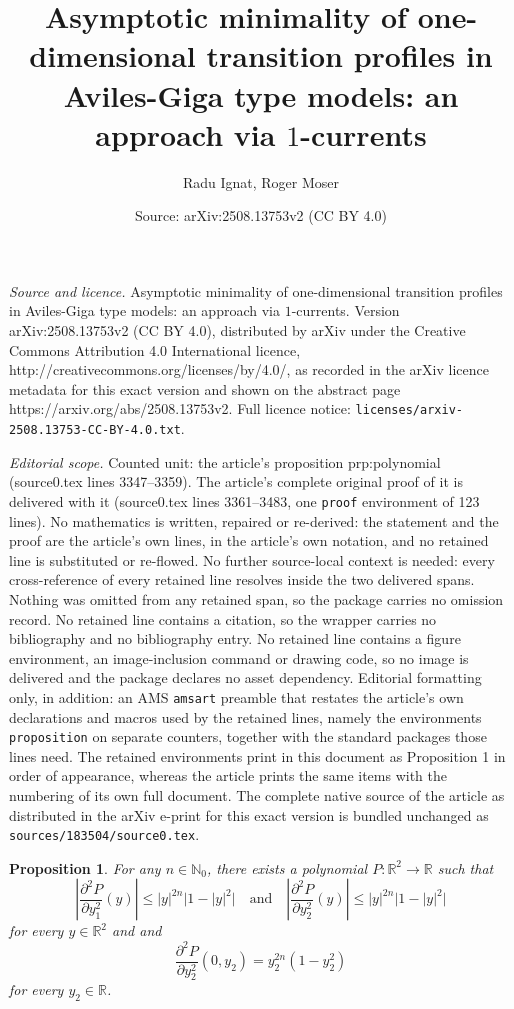 \documentclass[10pt,a4paper]{amsart}
\title{Asymptotic minimality of one-dimensional transition profiles in Aviles-Giga type models: an approach via $1$-currents}
\author{Radu Ignat, Roger Moser}
\date{Source: arXiv:2508.13753v2 (CC BY 4.0)}
\newtheorem{proposition}{Proposition}
\newcommand{\N}{\mathbb{N}}
\newcommand{\R}{\mathbb{R}}
\begin{document}
\maketitle

\noindent\emph{Source and licence.} Asymptotic minimality of one-dimensional transition profiles in Aviles-Giga type models: an approach via $1$-currents. Version arXiv:2508.13753v2 (CC BY 4.0), distributed by arXiv under the Creative Commons Attribution 4.0 International licence, http://creativecommons.org/licenses/by/4.0/, as recorded in the arXiv licence metadata for this exact version and shown on the abstract page https://arxiv.org/abs/2508.13753v2. Full licence notice: \texttt{licenses/arxiv-2508.13753-CC-BY-4.0.txt}.\par\smallskip

\noindent\textit{Editorial scope.} Counted unit: the article's proposition prp:polynomial (source0.tex lines 3347--3359). The article's complete original proof of it is delivered with it (source0.tex lines 3361--3483, one \texttt{proof} environment of 123 lines). No mathematics is written, repaired or re-derived: the statement and the proof are the article's own lines, in the article's own notation, and no retained line is substituted or re-flowed.  No further source-local context is needed: every cross-reference of every retained line resolves inside the two delivered spans.  Nothing was omitted from any retained span, so the package carries no omission record.  No retained line contains a citation, so the wrapper carries no bibliography and no bibliography entry.  No retained line contains a figure environment, an image-inclusion command or drawing code, so no image is delivered and the package declares no asset dependency.  Editorial formatting only, in addition: an AMS \texttt{amsart} preamble that restates the article's own declarations and macros used by the retained lines, namely the environments \texttt{proposition} on separate counters, together with the standard packages those lines need.  The retained environments print in this document as Proposition 1 in order of appearance, whereas the article prints the same items with the numbering of its own full document.  The complete native source of the article as distributed in the arXiv e-print for this exact version is bundled unchanged as \texttt{sources/183504/source0.tex}.
\begin{proposition} \label{prp:polynomial}
For any $n \in \N_0$, there exists a polynomial $P \colon \R^2 \to \R$ such
that
\begin{equation} \label{eq:second-derivatives-polynomial}
\left|\frac{\partial^2 P}{\partial y_1^2}(y)\right| \le |y|^{2n} \bigl|1 - |y|^2\bigr| \quad \text{and} \quad \left|\frac{\partial^2 P}{\partial y_2^2}(y)\right| \le |y|^{2n} \bigl|1 - |y|^2\bigr|
\end{equation}
for every $y \in \R^2$ and
and
\begin{equation} \label{eq:equality-polynomial}
\frac{\partial^2 P}{\partial y_2^2}(0, y_2) = y_2^{2n} (1 - y_2^2)
\end{equation}
for every $y_2 \in \R$.
\end{proposition}
\end{document}
